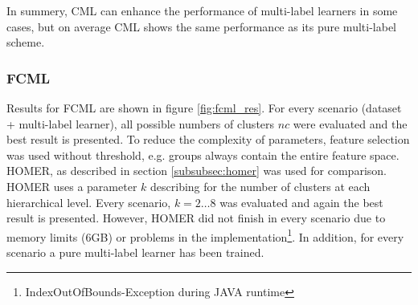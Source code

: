 			In summery, CML can enhance the performance of multi-label learners in some cases, but on average CML shows the same performance as its pure multi-label scheme.

		\subsubsection{FCML}

			Results for FCML are shown in figure \ref{fig:fcml_res}. For every scenario (dataset + multi-label learner), all possible numbers of clusters $nc$ were evaluated and the best result is presented. To reduce the complexity of parameters, feature selection was used without threshold, e.g. groups always contain the entire feature space. HOMER, as described in section \ref{subsubsec:homer} was used for comparison. HOMER uses a parameter $k$ describing for the number of clusters at each hierarchical level. Every scenario, $k=2\hdots 8$ was evaluated and again the best result is presented. However, HOMER did not finish in every scenario due to memory limits (6GB) or problems in the implementation\footnote{IndexOutOfBounds-Exception during JAVA runtime}. In addition, for every scenario a pure multi-label learner has been trained.

